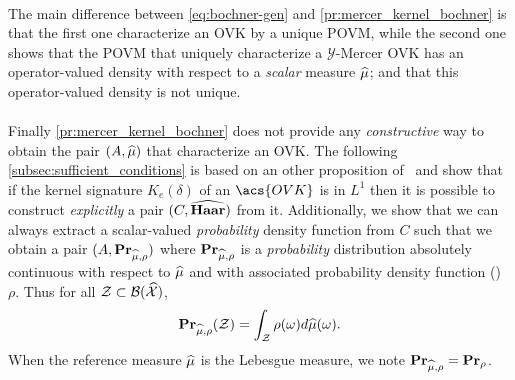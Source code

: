\paragraph{}
The main difference between \cref{eq:bochner-gen} and \cref{pr:mercer_kernel_bochner} is that the first one characterize an \acs{OVK} by a unique \acf{POVM}, while the second one shows that the \acs{POVM} that uniquely characterize a $\mathcal{Y}$-Mercer \acs{OVK} has an operator-valued density with respect to a \emph{scalar} measure $\widehat{\mu}$; and that this operator-valued density is not unique.
\paragraph{}
Finally \cref{pr:mercer_kernel_bochner} does not provide any \emph{constructive} way to obtain the pair $(A,\widehat{\mu})$ that characterize an \acs{OVK}.
The following \cref{subsec:sufficient_conditions} is based on an other proposition of~\citeauthor{carmeli2006vector} and show that if the kernel signature $K_e(\delta)$ of an $\acs{OVK}$ is in $L^1$ then it is possible to construct \emph{explicitly} a pair $(C,\widehat{\mathbf{Haar}})$ from it. Additionally, we show that we can always extract a scalar-valued \emph{probability} density function from $C$ such that we obtain a pair $(A,{\mathbf{{Pr}}}_{\widehat{\mu},\rho})$ where ${\mathbf{{Pr}}}_{\widehat{\mu},\rho}$ is a \emph{probability} distribution absolutely continuous with respect to $\widehat{\mu}$ and with associated probability density function (\pdf) $\rho$. Thus for all $\mathcal{Z}\subset\mathcal{B}(\widehat{\mathcal{X}})$,
\begin{dmath*}
\probability_{\dual{\mu},\rho}(\mathcal{Z})=\int_{\mathcal{Z}} \rho(\omega)d\dual{\mu}(\omega).
\end{dmath*}
When the reference measure $\widehat{\mu}$ is the Lebesgue measure, we note ${\mathbf{{Pr}}}_{\widehat{\mu},\rho}={\mathbf{{Pr}}}_\rho$.

